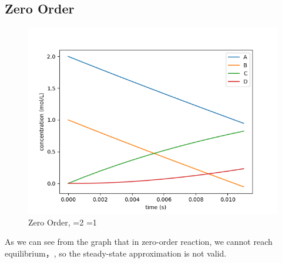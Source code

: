 \documentclass{article}
\begin{document}
\subsection{Zero Order}
\begin{figure}[H]
\centering
\includegraphics[scale=0.6]{1. zero.png}
\caption{Zero Order, =2 =1}
\end{figure}
As we can see from the graph that in zero-order reaction, we cannot reach equilibrium，, so the steady-state approximation is not valid.
\end{document}
